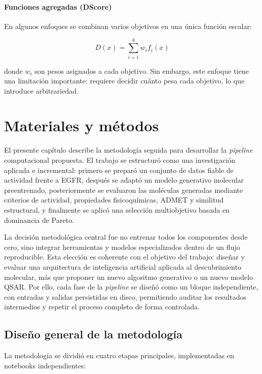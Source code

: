 \documentclass[IB]{TFUOC}%
\begin{document}
\subsubsection{Funciones agregadas (DScore)}

En algunos enfoques se combinan varios objetivos en una única función escalar:

\begin{equation}
D(x) = \sum_{i=1}^{k} w_i f_i(x)
\end{equation}

donde $w_i$ son pesos asignados a cada objetivo. Sin embargo, este enfoque tiene una limitación importante: requiere decidir cuánto pesa cada objetivo, lo que introduce arbitrariedad.


\chapter{Materiales y métodos}

El presente capítulo describe la metodología seguida para desarrollar la \textit{pipeline} computacional propuesta. El trabajo se estructuró como una investigación aplicada e incremental: primero se preparó un conjunto de datos fiable de actividad frente a EGFR, después se adaptó un modelo generativo molecular preentrenado, posteriormente se evaluaron las moléculas generadas mediante criterios de actividad, propiedades fisicoquímicas, ADMET y similitud estructural, y finalmente se aplicó una selección multiobjetivo basada en dominancia de Pareto.

La decisión metodológica central fue no entrenar todos los componentes desde cero, sino integrar herramientas y modelos especializados dentro de un flujo reproducible. Esta elección es coherente con el objetivo del trabajo: diseñar y evaluar una arquitectura de inteligencia artificial aplicada al descubrimiento molecular, más que proponer un nuevo algoritmo generativo o un nuevo modelo QSAR. Por ello, cada fase de la \textit{pipeline} se diseñó como un bloque independiente, con entradas y salidas persistidas en disco, permitiendo auditar los resultados intermedios y repetir el proceso completo de forma controlada.

\section{Diseño general de la metodología}

La metodología se dividió en cuatro etapas principales, implementadas en notebooks independientes:
\end{document}
